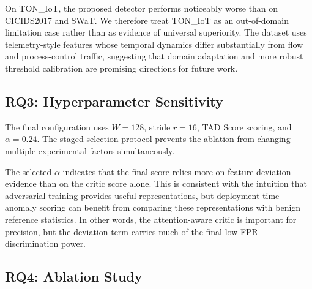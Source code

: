 \documentclass[conference]{IEEEtran}
\newcommand{\tad}{TAD Score}
\begin{document}
On TON\_IoT, the proposed detector performs noticeably worse than on CICIDS2017 and SWaT. We therefore treat TON\_IoT as an out-of-domain limitation case rather than as evidence of universal superiority. The dataset uses telemetry-style features whose temporal dynamics differ substantially from flow and process-control traffic, suggesting that domain adaptation and more robust threshold calibration are promising directions for future work.

\subsection{RQ3: Hyperparameter Sensitivity}
The final configuration uses $W=128$, stride $r=16$, \tad{} scoring, and $\alpha=0.24$. The staged selection protocol prevents the ablation from changing multiple experimental factors simultaneously.

The selected $\alpha$ indicates that the final score relies more on feature-deviation evidence than on the critic score alone. This is consistent with the intuition that adversarial training provides useful representations, but deployment-time anomaly scoring can benefit from comparing these representations with benign reference statistics. In other words, the attention-aware critic is important for precision, but the deviation term carries much of the final low-FPR discrimination power.
\FloatBarrier

\subsection{RQ4: Ablation Study}
\begin{table}[!t]
  \centering
  \caption{Ablation at target FPR 0.15. All rows use $W=128$, stride 16, and $\alpha=0.24$.}
  \label{tab:ablation}
  \small
  \setlength{\tabcolsep}{3.2pt}
\end{table}
\end{document}

